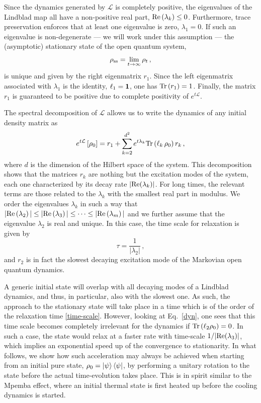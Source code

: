 \documentclass[prl,floatfix,twocolumn,superscriptaddress,showpacs,preprintnumbers,longbibliography,nofootinbib]{revtex4-1}
\begin{document}
Since the dynamics generated by $\mathcal{L}$ is completely positive, the eigenvalues of the Lindblad map all have a non-positive real part, ${\rm Re}\left(\lambda_k\right)\le0$. Furthermore, trace preservation enforces that at least one eigenvalue is zero, $\lambda_1=0$. If such an eigenvalue is non-degenerate --- we will work under this assumption --- the (asymptotic) stationary state of the open quantum system,
\begin{equation}
\rho_{\rm ss}=\lim_{t\to\infty}\rho_t\, ,
\label{rho_ss}
\end{equation}
is unique and given by the right eigenmatrix $r_1$. Since the left eigenmatrix associated with $\lambda_1$ is the identity, $\ell_1={\bf 1}$, one has $\Tr \left(r_1\right)=1$. Finally, the matrix $r_1$ is guaranteed to be positive due to complete positivity of $e^{t\mathcal{L}}$.

The spectral decomposition of $\mathcal{L}$ allows us to write the dynamics of any initial density matrix as 
\begin{equation}
e^{t\mathcal{L}}\left[\rho_0\right]=r_1+\sum_{k=2}^{d^2}e^{t\lambda_k}{\rm Tr}\left(\ell_k\, \rho_0\right)r_k\, ,
\label{dyn}
\end{equation}
where $d$ is the dimension of the Hilbert space of the system. This decomposition shows that the matrices $r_k$ are nothing but the excitation modes of the system, each one characterized by its decay rate $|{\rm Re}(\lambda_k)|$. For long times, the relevant terms are those related to the $\lambda_k$ with the smallest real part in modulus. We order the eigenvalues $\lambda_k$ in such a way that $|{\rm Re}\left(\lambda_2\right)|\le |{\rm Re}\left(\lambda_3\right)|\le \dots \le |{\rm Re}\left(\lambda_m\right)|$ and we further assume that the eigenvalue $\lambda_2$ is real and unique. In this case, the time scale for relaxation is given by  
\begin{equation}
\tau=\frac{1}{|\lambda_2|}\, , 
\label{time-scale}
\end{equation}
and $r_2$ is in fact the slowest decaying excitation mode of the Markovian open quantum dynamics. 
 
 A generic initial state will overlap with all decaying modes of a Lindblad dynamics, and thus, in particular, also with the slowest one. As such, the approach to the stationary state will take place in a time which is of the order of the relaxation time \eqref{time-scale}. However, looking at Eq.~\eqref{dyn}, one sees that this time scale becomes completely irrelevant for the dynamics if $\Tr\left(\ell_2 \rho_0\right)=0$. In such a case,  the state would relax at a faster rate with time-scale $1/|{\rm Re}(\lambda_3)|$, which implies an exponential speed up of the convergence to stationarity. In what follows, we show how such acceleration may always be achieved when starting from an initial pure state, $\rho_0=\ket{\psi}\bra{\psi}$, by performing a unitary rotation to the state before the actual time-evolution takes place. This is in spirit similar to the Mpemba effect, where an initial thermal state is first heated up before the cooling dynamics is started.
\end{document}
